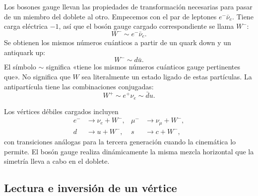 Los bosones gauge llevan las propiedades de transformación necesarias para pasar de un miembro del doblete al otro. Empecemos con el par de leptones \(e^-\bar\nu_e\). Tiene carga eléctrica \(-1\), así que el bosón gauge cargado correspondiente se llama \(W^-\):
\begin{equation}
W^-\sim e^-\bar\nu_e.
\end{equation}
Se obtienen los mismos números cuánticos a partir de un quark down y un antiquark up:
\begin{equation}
W^-\sim d\bar u.
\end{equation}
El símbolo \(\sim\) significa «tiene los mismos números cuánticos gauge pertinentes que». No significa que \(W\) sea literalmente un estado ligado de estas partículas. La antipartícula tiene las combinaciones conjugadas:
\begin{equation}
W^+\sim e^+\nu_e\sim\bar d u.
\end{equation}

Los vértices débiles cargados incluyen
\begin{align}
e^-&\longrightarrow\nu_e+W^-,
&
\mu^-&\longrightarrow\nu_\mu+W^-,
\label{eq:l5-lepton-w}\\
d&\longrightarrow u+W^-,
&
s&\longrightarrow c+W^-,
\label{eq:l5-quark-w}
\end{align}
con transiciones análogas para la tercera generación cuando la cinemática lo permite. El bosón gauge realiza dinámicamente la misma mezcla horizontal que la simetría lleva a cabo en el doblete.

\begin{classroomqa}\end{classroomqa}

\subsection{Lectura e inversión de un vértice}

